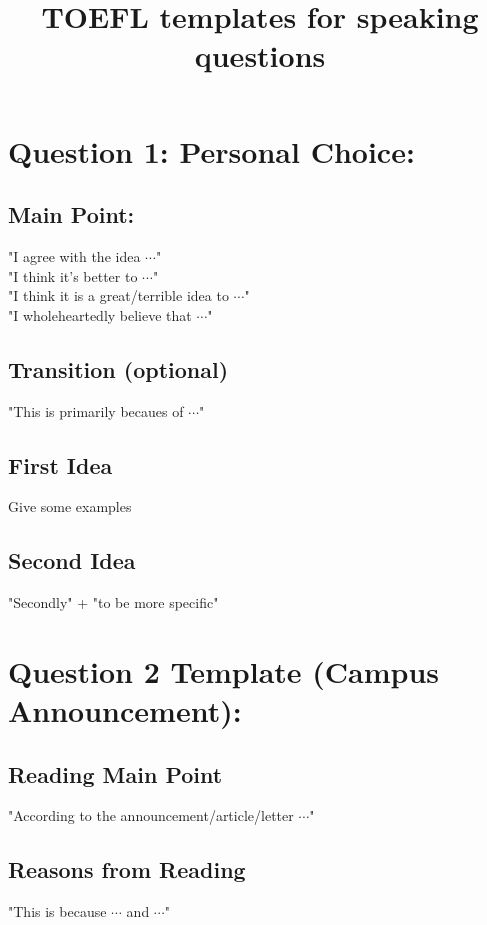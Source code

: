 \documentclass[11pt]{article}
\title{TOEFL templates for speaking questions}
\begin{document}
\maketitle
\section*{Question 1: Personal Choice:}
\subsection*{Main Point:}
    "I agree with the idea $\cdots$"\\

    "I think it's better to $\cdots$"\\

    "I think it is a great/terrible idea to $\cdots$"\\

    "I wholeheartedly believe that $\cdots$"\\
\subsection*{Transition (optional)}
    "This is primarily becaues of $\cdots$"\\

\subsection*{First Idea}
Give some examples\\

\subsection*{Second Idea}
"Secondly" + "to be more specific"\\

\section*{Question 2 Template (Campus Announcement):}
\subsection*{Reading Main Point}
"According to the announcement/article/letter $\cdots$"\\

\subsection*{Reasons from Reading}
"This is because $\cdots$ and $\cdots$"
\end{document}
